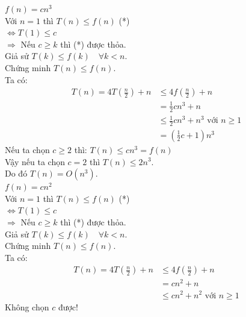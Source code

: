 \documentclass[12pt, a4paper, fleqn]{article}
\begin{document}
		\underline{$f(n) = cn^3$}\\
		Với $n = 1$ thì $T(n) \leq f(n)$ \hspace{100pt} (*)\\
		$\Leftrightarrow  T(1) \leq c$\\
		$\Rightarrow$ Nếu $c \geq k$ thì (*) được thỏa.\\
		Giả sử $T(k) \leq f(k) \quad \forall k < n$.\\
		Chứng minh $T(n) \leq f(n)$.\\
		Ta có:
		\begin{align*}
		T(n) = 4T\left( \frac{n}{2} \right) + n &\leq 4f\left( \frac{n}{2}\right) + n\\
		&= \frac{1}{2} cn^3 + n\\
		&\leq \frac{1}{2} cn^3 + n^3 \text{ với } n \geq 1\\
		&= \left( \frac{1}{2} c + 1 \right) n^3
		\end{align*}
		Nếu ta chọn $c \geq 2$ thì: $T(n) \leq cn^3 = f(n)$\\
		Vậy nếu ta chọn $c = 2$ thì $T(n) \leq 2n^3$.\\
		Do đó $T(n) = O(n^3)$.\\
		
		\underline{$f(n) = cn^2$}\\
		Với $n = 1$ thì $T(n) \leq f(n)$ \hspace{100pt} (*)\\
		$\Leftrightarrow  T(1) \leq c$\\
		$\Rightarrow$ Nếu $c \geq k$ thì (*) được thỏa.\\
		Giả sử $T(k) \leq f(k) \quad \forall k < n$.\\
		Chứng minh $T(n) \leq f(n)$.\\
		Ta có:
		\begin{align*}
		T(n) = 4T\left( \frac{n}{2} \right) + n &\leq 4f\left( \frac{n}{2}\right) + n\\
		&= cn^2 + n\\
		&\leq cn^2 + n^2 \text{ với } n \geq 1
		\end{align*}
		Không chọn $c$ được!\\
		
\end{document}
